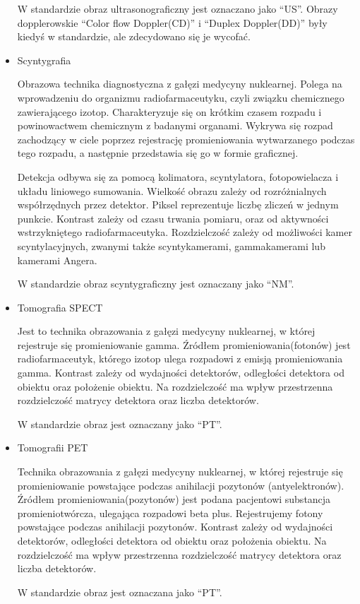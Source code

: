 \begin{itemize}
          W standardzie \DICOM obraz ultrasonograficzny jest oznaczano jako \enquote{US}.
          Obrazy dopplerowskie \enquote{Color flow Doppler(CD)} i \enquote{Duplex Doppler(DD)} były kiedyś w standardzie, ale zdecydowano się je wycofać.

    \item Scyntygrafia

          Obrazowa technika diagnostyczna z gałęzi medycyny nuklearnej.
          Polega na wprowadzeniu do organizmu radiofarmaceutyku, czyli związku chemicznego zawierającego izotop.
          Charakteryzuje się on krótkim czasem rozpadu i powinowactwem chemicznym z badanymi organami.
          Wykrywa się rozpad zachodzący w ciele poprzez rejestrację promieniowania wytwarzanego podczas tego rozpadu, a następnie przedstawia się go w formie graficznej.

          Detekcja odbywa się za pomocą kolimatora, scyntylatora, fotopowielacza i układu liniowego sumowania.
          Wielkość obrazu zależy od rozróżnialnych współrzędnych przez detektor.%
          Piksel reprezentuje liczbę zliczeń w jednym punkcie.
          Kontrast zależy od czasu trwania pomiaru, oraz od aktywności wstrzykniętego radiofarmaceutyka.
          Rozdzielczość zależy od możliwości kamer scyntylacyjnych, zwanymi także scyntykamerami, gammakamerami lub kamerami Angera.

          W standardzie \DICOM obraz scyntygraficzny jest oznaczany jako \enquote{NM}.

    \item Tomografia SPECT

          Jest to technika obrazowania z gałęzi medycyny nuklearnej, w której rejestruje się promieniowanie gamma.
          Źródłem promieniowania(fotonów) jest radiofarmaceutyk, którego izotop ulega rozpadowi z emisją promieniowania gamma.
          Kontrast zależy od wydajności detektorów, odległości detektora od obiektu oraz położenie obiektu.
          Na rozdzielczość ma wpływ przestrzenna rozdzielczość matrycy detektora oraz liczba detektorów.

          W standardzie \DICOM obraz jest oznaczany jako \enquote{PT}.

    \item Tomografii PET

          Technika obrazowania  z gałęzi medycyny nuklearnej, w której rejestruje się promieniowanie powstające podczas anihilacji pozytonów (antyelektronów).
          Źródłem promieniowania(pozytonów) jest podana pacjentowi substancja promieniotwórcza, ulegająca rozpadowi beta plus.
          Rejestrujemy fotony powstające podczas anihilacji pozytonów.
          Kontrast zależy od wydajności detektorów, odległości detektora od obiektu oraz położenia obiektu.
          Na rozdzielczość ma wpływ przestrzenna rozdzielczość matrycy detektora oraz liczba detektorów.

          W standardzie \DICOM obraz jest oznaczana jako \enquote{PT}.

\end{itemize}

